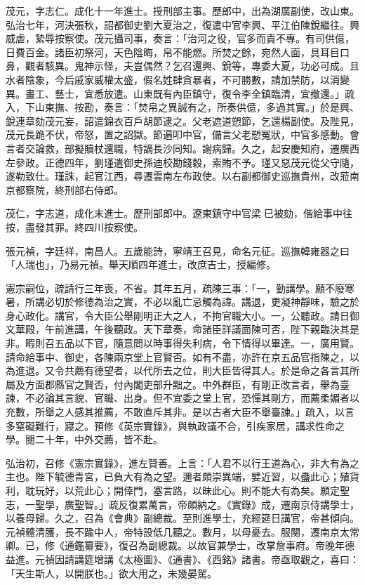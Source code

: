 \begin{pinyinscope}
茂元，字志仁。成化十一年進士。授刑部主事。歷郎中，出為湖廣副使，改山東。弘治七年，河決張秋，詔都御史劉大夏治之，復遣中官李興、平江伯陳銳繼往。興威虐，縶辱按察使。茂元攝司事，奏言：「治河之役，官多而責不專。有司供億，日費百金。諸臣初祭河，天色陰晦，帛不能燃。所焚之餘，宛然人面，具耳目口鼻，觀者駭異。鬼神示怪，夫豈偶然？乞召還興、銳等，專委大夏，功必可成。且水者陰象，今后戚家威權太盛，假名姓肆貪暴者，不可勝數，請加禁防，以消變異。畫工、藝士，宜悉放遣。山東既有內臣鎮守，復令李全鎮臨清，宜撤還。」疏入，下山東撫、按勘，奏言：「焚帛之異誠有之，所奏供億，多過其實。」於是興、銳連章劾茂元妄，詔遣錦衣百戶胡節逮之。父老遮道愬節，乞還楊副使。及陛見，茂元長跪不伏，帝怒，置之詔獄。節遍叩中官，備言父老愬冤狀，中官多感動。會言者交論救，部擬贖杖還職，特謫長沙同知。謝病歸。久之，起安慶知府，遷廣西左參政。正德四年，劉瑾遣御史孫迪校勘錢穀，索賄不予。瑾又惡茂元從父守隨，遂勒致仕。瑾誅，起官江西，尋遷雲南左布政使。以右副都御史巡撫貴州，改蒞南京都察院，終刑部右侍郎。

茂仁，字志道，成化末進士。歷刑部郎中。遼東鎮守中官梁巳被劾，偕給事中往按，盡發其罪。終四川按察使。

張元禎，字廷祥，南昌人。五歲能詩，寧靖王召見，命名元征。巡撫韓雍器之曰「人瑞也」，乃易元禎。舉天順四年進士，改庶吉士，授編修。

憲宗嗣位，疏請行三年喪，不省。其年五月，疏陳三事：「一，勤講學。願不廢寒暑，所講必切於修德為治之實，不必以亂亡忌觸為諱。講退，更凝神靜味，驗之於身心政化。講官，令大臣公舉剛明正大之人，不拘官職大小。一，公聽政。請日御文華殿，午前進講，午後聽政。天下章奏，命諸臣詳議面陳可否，陛下親臨決其是非。暇則召五品以下官，隨意問以時事得失利病，令下情得以畢達。一，廣用賢。請命給事中、御史，各陳兩京堂上官賢否。如有不盡，亦許在京五品官指陳之，以為進退。又令共薦有德望者，以代所去之位，則大臣皆得其人。於是命之各言其所屬及方面郡縣官之賢否，付內閣吏部升黜之。中外群臣，有剛正改言者，舉為臺諫，不必論其言貌、官職、出身。但不宜委之堂上官，恐憚其剛方，而薦柔媚者以充數，所舉之人感其推薦，不敢直斥其非。是以古者大臣不舉臺諫。」疏入，以言多窒礙難行，寢之。預修《英宗實錄》，與執政議不合，引疾家居，講求性命之學。閱二十年，中外交薦，皆不赴。

弘治初，召修《憲宗實錄》，進左贊善。上言：「人君不以行王道為心，非大有為之主也。陛下毓德青宮，已負大有為之望。邇者頗崇異端，嬖近習，以蠱此心；殖貨利，耽玩好，以荒此心；開倖門，塞言路，以昧此心。則不能大有為矣。願定聖志，一聖學，廣聖智。」疏反復累萬言，帝頗納之。《實錄》成，遷南京侍講學士，以養母歸。久之，召為《會典》副總裁。至則進學士，充經筵日講官，帝甚傾向。元禎體清臒，長不踰中人，帝特設低几聽之。數月，以母憂去。服闋，遷南京太常卿。已，修《通鑑纂要》，復召為副總裁。以故官兼學士，改掌詹事府。帝晚年德益進。元禎因請講筵增講《太極圖》、《通書》、《西銘》諸書。帝亟取觀之，喜曰：「天生斯人，以開朕也。」欲大用之，未幾晏駕。


\end{pinyinscope}
